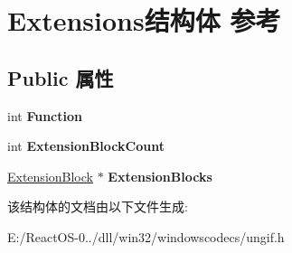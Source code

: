 \hypertarget{struct_extensions}{}\section{Extensions结构体 参考}
\label{struct_extensions}
\subsection*{Public 属性}
\begin{DoxyCompactItemize}
\item 
\mbox{\label{struct_extensions_a1a301254068ae038f892894211b1f984}} 
int {\bfseries Function}
\item 
\mbox{\label{struct_extensions_ac8b4bca6fafc50ee687cb25be1d2cf01}} 
int {\bfseries Extension\+Block\+Count}
\item 
\mbox{\label{struct_extensions_aa711436a0bb63068a1afd0796a144778}} 
\hyperlink{struct_extension_block}{Extension\+Block} $\ast$ {\bfseries Extension\+Blocks}
\end{DoxyCompactItemize}


该结构体的文档由以下文件生成\+:\begin{DoxyCompactItemize}
\item 
E\+:/\+React\+O\+S-\/0../dll/win32/windowscodecs/ungif.\+h\end{DoxyCompactItemize}
